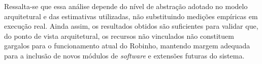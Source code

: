 Ressalta-se que essa análise depende do nível de abstração adotado no modelo arquitetural e das estimativas utilizadas, não substituindo medições empíricas em execução real. Ainda assim, os resultados obtidos são suficientes para validar que, do ponto de vista arquitetural, os recursos não vinculados não constituem gargalos para o funcionamento atual do Robinho, mantendo margem adequada para a inclusão de novos módulos de \textit{software} e extensões futuras do sistema.